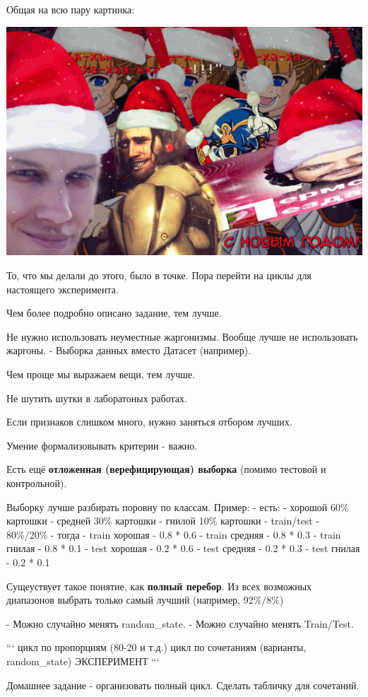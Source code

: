 Общая на всю пару картинка:

\includegraphics[scale=0.3]{figures/samplefigure.jpg}

То, что мы делали до этого, было в точке.
Пора перейти на циклы для настоящего эксперимента.

Чем более подробно описано задание, тем лучше.

Не нужно использовать неуместные жаргонизмы.
Вообще лучше не использовать жаргоны.
- Выборка данных вместо Датасет (например).

Чем проще мы выражаем вещи, тем лучше.

Не шутить шутки в лаборатоных работах.

Если признаков слишком много, нужно заняться отбором лучших.

Умение формализовывать критерии - важно.

Есть ещё \textbf{отложенная (верефицирующая) выборка} (помимо тестовой и
контрольной).

Выборку лучше разбирать поровну по классам.
Пример:
- есть:
    - хорошой 60\% картошки
    - средней 30\% картошки
    - гнилой 10\% картошки
- train/test - 80\%/20\%
- тогда
    - train хорошая - 0.8 * 0.6
    - train средняя - 0.8 * 0.3
    - train гнилая - 0.8 * 0.1
    - test хорошая - 0.2 * 0.6
    - test средняя - 0.2 * 0.3
    - test гнилая - 0.2 * 0.1

Сущеуствует такое понятие, как \textbf{полный перебор}.
Из всех возможных диапазонов выбрать только самый лучший (например, 92\%/8\%)

- Можно случайно менять random\_state.
- Можно случайно менять Train/Test.

```
цикл по пропорциям (80-20 и т.д.)
    цикл по сочетаниям (варианты, random\_state)
        ЭКСПЕРИМЕНТ
```

Домашнее задание - организовать полный цикл.
Сделать табличку для сочетаний.